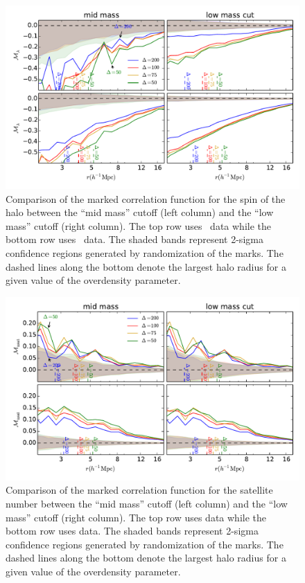 \documentclass[usenatbib,usegraphicx,letterpaper]{mn2e}
\begin{document}
\begin{figure}
	\centering
	\includegraphics[width=.9\textwidth]{all_mcf_spin_z00_hostsvlow.pdf}
	\caption{Comparison of the marked correlation function for the spin of the halo between the ``mid mass'' cutoff (left column) and the ``low mass'' cutoff (right column). The top row uses \simA \ data while the bottom row uses \simB \ data. The shaded bands represent 2-sigma confidence regions generated by randomization of the marks. The dashed lines along the bottom denote the largest halo radius for a given value of the overdensity parameter.}
	\label{fig:hvl_mcf_spin}
\end{figure}

\begin{figure}
	\centering
	\includegraphics[width=.9\textwidth]{all_mcf_nsat_z00_hostsvlow.pdf}
	\caption{Comparison of the marked correlation function for the satellite number between the ``mid mass'' cutoff (left column) and the ``low mass'' cutoff (right column). The top row uses \simA data while the bottom row uses \simB data. The shaded bands represent 2-sigma confidence regions generated by randomization of the marks. The dashed lines along the bottom denote the largest halo radius for a given value of the overdensity parameter.}
	\label{fig:hvl_mcf_nsat}
\end{figure}
\end{document}
